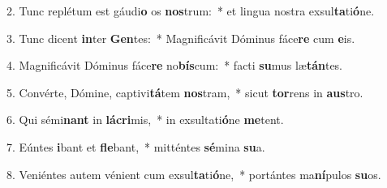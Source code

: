 2. Tunc replétum est gáudi\textbf{o} os \textbf{nos}trum:~*  et lingua nostra exsul\textbf{ta}ti\textbf{ó}ne.\

3. Tunc dicent \textbf{in}ter \textbf{Gen}tes:~*  Magnificávit Dóminus fáce\textbf{re} cum \textbf{e}is.\

4. Magnificávit Dóminus fáce\textbf{re} no\textbf{bís}cum:~*  facti \textbf{su}mus læ\textbf{tán}tes.\

5. Convérte, Dómine, captivi\textbf{tá}tem \textbf{nos}tram,~*  sicut \textbf{tor}rens in \textbf{aus}tro.\

6. Qui sémi\textbf{nant} in \textbf{lá}\textbf{cri}mis,~*  in exsultati\textbf{ó}ne \textbf{me}tent.\

7. Eúntes \textbf{i}bant et \textbf{fle}bant,~*  mitténtes \textbf{sé}mina \textbf{su}a.\

8. Veniéntes autem vénient cum exsul\textbf{ta}ti\textbf{ó}ne,~*  portántes ma\textbf{ní}pulos \textbf{su}os.\

